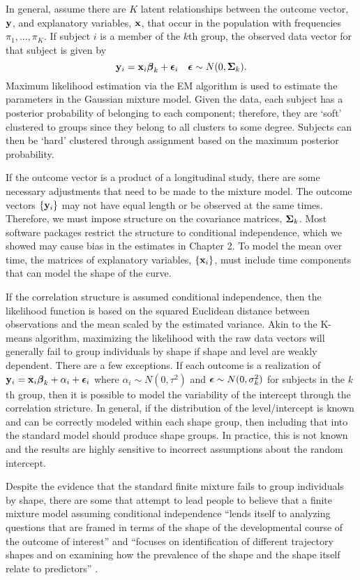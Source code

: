 In general, assume there are $K$ latent relationships between the outcome vector, $\mathbf y$, and explanatory variables, $\mathbf x$, that occur in the population with frequencies $\pi_{1},...,\pi_{K}$. If subject $i$ is a member of the $k$th group, the observed data vector for that subject is given by
$$\mathbf y_{i} = \mathbf x_{i}\boldsymbol\beta_{k}+\boldsymbol\epsilon_{i}\quad \boldsymbol\epsilon \sim N(0,\boldsymbol\Sigma_{k}).$$
Maximum likelihood estimation via the EM algorithm is used to estimate the parameters in the Gaussian mixture model. Given the data, each subject has a posterior probability of belonging to each component; therefore, they are `soft' clustered to groups since they belong to all clusters to some degree. Subjects can then be `hard' clustered through assignment based on the maximum posterior probability. 

If the outcome vector is a product of a longitudinal study, there are some necessary adjustments that need to be made to the mixture model. The outcome vectors $\{\mathbf y_{i}\}$ may not have equal length or be observed at the same times. Therefore, we must impose structure on the covariance matrices, $\boldsymbol\Sigma_{k}$. Most software packages restrict the structure to conditional independence, which we showed may cause bias in the estimates in Chapter 2. To model the mean over time, the matrices of explanatory variables, $\{\mathbf x_{i}\}$, must include time components that can model the shape of the curve. 

If the correlation structure is assumed conditional independence, then the likelihood function is based on the squared Euclidean distance between observations and the mean scaled by the estimated variance. Akin to the K-means algorithm, maximizing the likelihood with the raw data vectors will generally fail to group individuals by shape if shape and level are weakly dependent. There are a few exceptions. If each outcome is a realization of $\mathbf y_{i} = \mathbf x_{i}\boldsymbol\beta_{k} + \alpha_{i}+\boldsymbol\epsilon_{i}$ where $\alpha_{i}\sim N(0,\tau^{2})$ and $\boldsymbol\epsilon\sim N(0,\sigma^{2}_{k})$ for subjects in the $k$th group, then it is possible to model the variability of the intercept through the correlation stricture. In general, if the distribution of the level/intercept is known and can be correctly modeled within each shape group, then including that into the standard model should produce shape groups. In practice, this is not known and the results are highly sensitive to incorrect assumptions about the random intercept.

Despite the evidence that the standard finite mixture fails to group individuals by shape, there are some that attempt to lead people to believe that a finite mixture model assuming conditional independence ``lends itself to analyzing questions that are framed in terms of the shape of the developmental course of the outcome of interest''  and  ``focuses on identification of different trajectory shapes and on examining how the prevalence of the shape and the shape itself relate to predictors'' \cite{nagin2005}.


